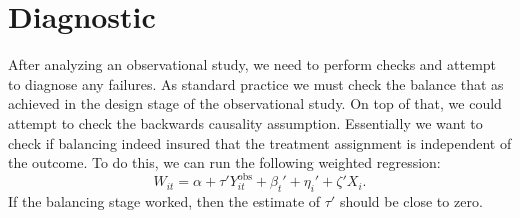 \documentclass[a4paper]{article}
\begin{document}
\section{Diagnostic}

After analyzing an observational study, we need to perform checks and attempt to diagnose any failures. As standard practice we must check the balance that as achieved in the design stage of the observational study. On top of that, we could attempt to check the backwards causality assumption. Essentially we want to check if balancing indeed insured that the treatment assignment is independent of the outcome. To do this, we can run the following weighted regression:
\[
	W_{it} = \alpha + \tau' Y_{it}^\text{obs} + \beta_t' + \eta_{i}' + \zeta' X_{i}.
\]
If the balancing stage worked, then the estimate of $\tau'$ should be close to zero. 









































% 
% 
\end{document}
